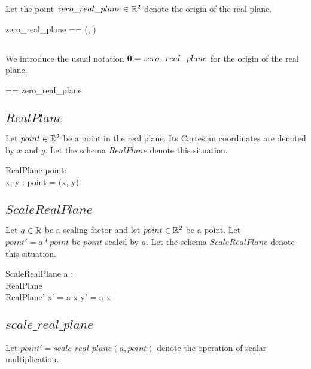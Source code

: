 \documentclass{amsart}
\begin{document}
Let the point $zero\_real\_plane \in \mathbb{R}^2$ denote the origin of the real plane.

\begin{zed}
	zero\_real\_plane == (\zeroR, \zeroR)
\end{zed}

\subsection{}

We introduce the usual notation $\mathbf{0} = zero\_real\_plane$ for the origin of the real plane.

\begin{zed}
	\zeroRtwo == zero\_real\_plane
\end{zed}

\subsection{$RealPlane$}

Let $point \in \mathbb{R}^2$ be a point in the real plane.
Its Cartesian coordinates are denoted by $x$ and $y$.
Let the schema $RealPlane$ denote this situation.

\begin{schema}{RealPlane}
	point: \Rtwo \\
	x, y : \R
\where
	point = (x, y)
\end{schema}

\subsection{$ScaleRealPlane$}

Let $a \in \mathbb{R}$ be a scaling factor and let $point \in \mathbb{R}^2$ be a point.
Let $point' = a * point$ be  $point$ scaled by $a$.
Let the schema $ScaleRealPlane$ denote this situation.

\begin{schema}{ScaleRealPlane}
	a : \R \\
	RealPlane \\
	RealPlane'
\where
	x' = a \mulR x
\also
	y' = a \mulR x
\end{schema}

\subsection{$scale\_real\_plane$}

Let $point' = scale\_real\_plane(a, point)$ denote the operation of scalar multiplication.
\end{document}

